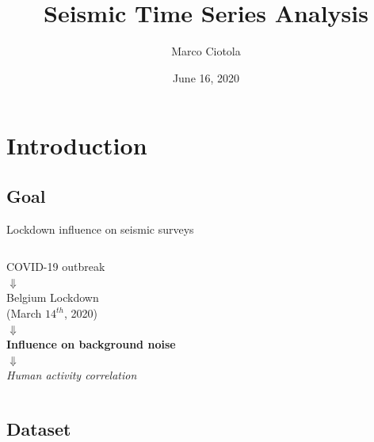 \documentclass{beamer}
\title[Seismic Time Series Analysis]{Seismic Time Series Analysis} %
\author{Marco Ciotola} %
\institute[Ca' Foscari] %
{
	Ca' Foscari University\\ %
	\medskip
	\textit{848222@stud.unive.it} %
}
\date{June 16, 2020} %
\begin{document}
	

\begin{frame}
	\titlepage %
\end{frame}


\section{Introduction} %
\subsection{Goal}
\begin{frame}{Lockdown influence on seismic surveys}
	\begin{columns}[c]
		\centering\large COVID-19 outbreak\\
		\vspace{.5em}\centering\large$\Downarrow$\vspace{.5em}\\
		\centering\large Belgium Lockdown\\\small(March $14^{th}$, 2020) \\
		\vspace{.5em}\centering\large$\Downarrow$\vspace{.5em}\\
		\centering\large \textbf{Influence on background noise}\\
		\vspace{.5em}\centering\large$\Downarrow$\vspace{.5em}\\
		\centering\large \textit{Human activity correlation} \\
	\end{columns}
\end{frame}

\subsection{Dataset}
\end{document}
